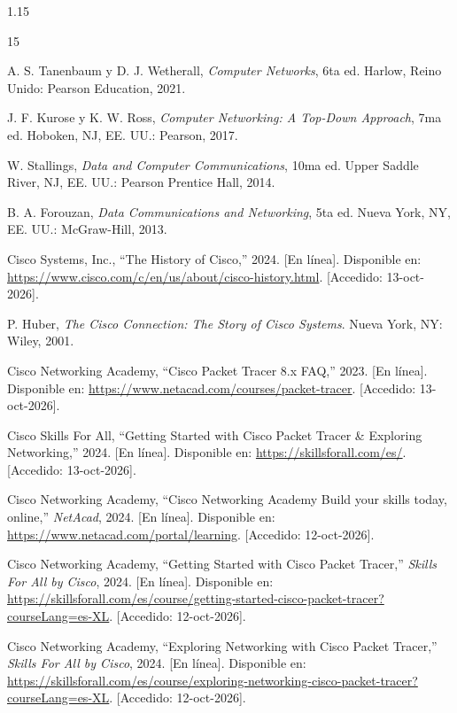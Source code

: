 \documentclass[11pt, a4paper]{article}
\begin{document}
\begin{spacing}{1.15}
\clearpage

\renewcommand{\refname}{Referencias}
\begin{thebibliography}{15}

A. S. Tanenbaum y D. J. Wetherall, \textit{Computer Networks}, 6ta ed. Harlow, Reino Unido: Pearson Education, 2021.

J. F. Kurose y K. W. Ross, \textit{Computer Networking: A Top-Down Approach}, 7ma ed. Hoboken, NJ, EE. UU.: Pearson, 2017.

W. Stallings, \textit{Data and Computer Communications}, 10ma ed. Upper Saddle River, NJ, EE. UU.: Pearson Prentice Hall, 2014.

B. A. Forouzan, \textit{Data Communications and Networking}, 5ta ed. Nueva York, NY, EE. UU.: McGraw-Hill, 2013.

Cisco Systems, Inc., ``The History of Cisco,'' 2024. [En línea]. Disponible en: \url{https://www.cisco.com/c/en/us/about/cisco-history.html}. [Accedido: 13-oct-2026].

P. Huber, \textit{The Cisco Connection: The Story of Cisco Systems}. Nueva York, NY: Wiley, 2001.

Cisco Networking Academy, ``Cisco Packet Tracer 8.x FAQ,'' 2023. [En línea]. Disponible en: \url{https://www.netacad.com/courses/packet-tracer}. [Accedido: 13-oct-2026].

Cisco Skills For All, ``Getting Started with Cisco Packet Tracer \& Exploring Networking,'' 2024. [En línea]. Disponible en: \url{https://skillsforall.com/es/}. [Accedido: 13-oct-2026].

Cisco Networking Academy, ``Cisco Networking Academy Build your skills today, online,'' \textit{NetAcad}, 2024. [En línea]. Disponible en: \url{https://www.netacad.com/portal/learning}. [Accedido: 12-oct-2026].

Cisco Networking Academy, ``Getting Started with Cisco Packet Tracer,'' \textit{Skills For All by Cisco}, 2024. [En línea]. Disponible en: \url{https://skillsforall.com/es/course/getting-started-cisco-packet-tracer?courseLang=es-XL}. [Accedido: 12-oct-2026].

Cisco Networking Academy, ``Exploring Networking with Cisco Packet Tracer,'' \textit{Skills For All by Cisco}, 2024. [En línea]. Disponible en: \url{https://skillsforall.com/es/course/exploring-networking-cisco-packet-tracer?courseLang=es-XL}. [Accedido: 12-oct-2026].

\end{thebibliography}

\end{spacing}
\end{document}
